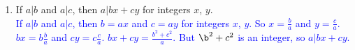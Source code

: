 \documentclass[13.5pt]{article}
\begin{document}
\begin{enumerate}
\begin{enumerate}
\item{If \(a|b\) and \(a|c\), then \(a|bx+cy\) for integers \(x\), \(y\).}\\
\textcolor{blue} {If \(a|b\) and \(a|c\), then \(b=ax\) and \(c=ay\) for integers \(x\), \(y\). So \(x=\frac{b}{a}\) and \(y=\frac{c}{a}\). \(bx=b\frac{b}{a}\) and \(cy=c\frac{c}{a}\). \(bx+cy=\frac{b^2+c^2}{a}\). But \(\b^2+c^2\) is an integer, so \(a|bx+cy\).} 



\end{enumerate}



\end{enumerate}
\end{document}
